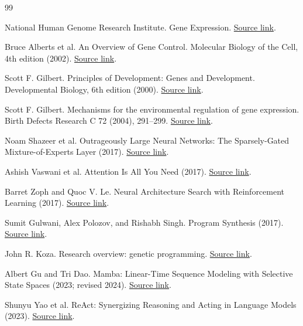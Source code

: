 \begin{thebibliography}{99}
 National Human Genome Research Institute. Gene Expression. \href{https://www.genome.gov/genetics-glossary/Gene-Expression}{Source link}.

 Bruce Alberts et al. An Overview of Gene Control. Molecular Biology of the Cell, 4th edition (2002). \href{https://www.ncbi.nlm.nih.gov/books/NBK26885/}{Source link}.

 Scott F. Gilbert. Principles of Development: Genes and Development. Developmental Biology, 6th edition (2000). \href{https://www.ncbi.nlm.nih.gov/books/NBK10050/}{Source link}.

 Scott F. Gilbert. Mechanisms for the environmental regulation of gene expression. Birth Defects Research C 72 (2004), 291--299. \href{https://pubmed.ncbi.nlm.nih.gov/15662704/}{Source link}.

 Noam Shazeer et al. Outrageously Large Neural Networks: The Sparsely-Gated Mixture-of-Experts Layer (2017). \href{https://arxiv.org/abs/1701.06538}{Source link}.

 Ashish Vaswani et al. Attention Is All You Need (2017). \href{https://arxiv.org/abs/1706.03762}{Source link}.

 Barret Zoph and Quoc V. Le. Neural Architecture Search with Reinforcement Learning (2017). \href{https://arxiv.org/abs/1611.01578}{Source link}.

 Sumit Gulwani, Alex Polozov, and Rishabh Singh. Program Synthesis (2017). \href{https://www.microsoft.com/en-us/research/publication/program-synthesis/}{Source link}.

 John R. Koza. Research overview: genetic programming. \href{https://www.genetic-programming.com/johnkoza.html}{Source link}.

 Albert Gu and Tri Dao. Mamba: Linear-Time Sequence Modeling with Selective State Spaces (2023; revised 2024). \href{https://arxiv.org/abs/2312.00752}{Source link}.

 Shunyu Yao et al. ReAct: Synergizing Reasoning and Acting in Language Models (2023). \href{https://arxiv.org/abs/2210.03629}{Source link}.
\end{thebibliography}
